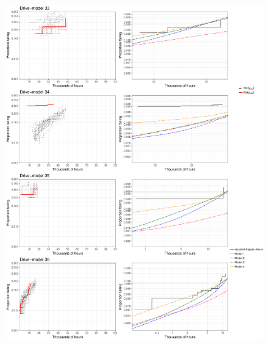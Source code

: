 \documentclass[12pt]{article}
\begin{document}
\begin{figure}[H]
\includegraphics[width=\textwidth]{ppcheck-v3-9.pdf}
\end{figure}
\end{document}
